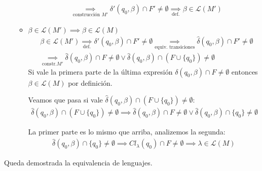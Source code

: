 \begin{itemize}
\begin{itemize}
\begin{align*}
                   & \underset{\text{construcción } M'}{\implies} \delta'(q_0,\beta)\cap F' \neq \emptyset \underset{\text{def.}}{\implies} \beta\in \mathcal{L}(M')
                \end{align*}
          \item \(\beta\in\mathcal{L}(M') \implies \beta\in\mathcal{L}(M)\)
                \begin{align*}
                   & \beta\in \mathcal{L}(M') \underset{\text{def.}}{\implies} \delta'(q_0,\beta)\cap F' \neq \emptyset \underset{\text{equiv. transiciones}}{\implies} \hat\delta(q_0,\beta)\cap F' \neq \emptyset \\
                   & \underset{\text{constr.} M'}{\implies} \hat\delta(q_0,\beta)\cap F \neq \emptyset \lor \hat\delta(q_0,\beta)\cap(F\cup\{q_0\}) \neq \emptyset
                \end{align*}
                Si vale la primera parte de la última expresión \(\delta(q_0,\beta)\cap F \neq \emptyset\) entonces \(\beta\in \mathcal{L}(M)\) por definición.

                Veamos que pasa si vale \(\hat\delta(q_0,\beta)\cap(F\cup\{q_0\}) \neq \emptyset\):
                \begin{align*}
                  \hat\delta(q_0,\beta)\cap(F\cup\{q_0\}) \neq \emptyset \implies \hat\delta(q_0,\beta)\cap F \neq \emptyset \lor \hat\delta(q_0,\beta)\cap\{q_0\} \neq \emptyset
                \end{align*}

                La primer parte es lo mismo que arriba, analizemos la segunda:
                \begin{align*}
                  \hat\delta(q_0,\beta)\cap\{q_0\} \neq \emptyset \implies Cl_\lambda(q_0)\cap F \neq \emptyset \implies \lambda\in \mathcal{L}(M)
                \end{align*}
        \end{itemize}
\end{itemize}
Queda demostrada la equivalencia de lenguajes.



